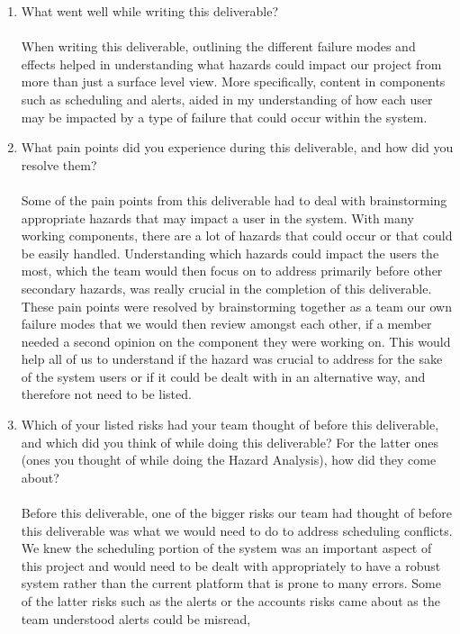\documentclass{article}
\begin{document}
\begin{enumerate}
  \item What went well while writing this deliverable?\\\\
  When writing this deliverable, outlining the different failure modes and effects 
  helped in understanding what hazards could impact our project from more than just a
  surface level view. More specifically, content in components such as scheduling and
  alerts, aided in my understanding of how each user may be impacted by a type of failure
  that could occur within the system.
  \item What pain points did you experience during this deliverable, and how
  did you resolve them?\\\\
  Some of the pain points from this deliverable had to deal with brainstorming
  appropriate hazards that may impact a user in the system. With many working components,
  there are a lot of hazards that could occur or that could be easily handled. 
  Understanding which hazards could impact the users the most, which the team would then
  focus on to address primarily before other secondary hazards, was really crucial
  in the completion of this deliverable. These pain points were resolved
  by brainstorming together as a team our own failure modes that we would then review
  amongst each other, if a member needed a second opinion on the component they were
  working on. This would help all of us to understand if the hazard was crucial to
  address for the sake of the system users or if it could be dealt with in an alternative
  way, and therefore not need to be listed.
  \item Which of your listed risks had your team thought of before this
  deliverable, and which did you think of while doing this deliverable? For
  the latter ones (ones you thought of while doing the Hazard Analysis), how
  did they come about?
  \\\\
  Before this deliverable, one of the bigger risks our team had thought of before
  this deliverable was what we would need to do to address scheduling conflicts.
  We knew the scheduling portion of the system was an important aspect of this project
  and would need to be dealt with appropriately to have a robust system rather than the
  current platform that is prone to many errors. Some of the latter risks such as the
  alerts or the accounts risks came about as the team understood alerts could be misread,

\end{enumerate}
\end{document}
